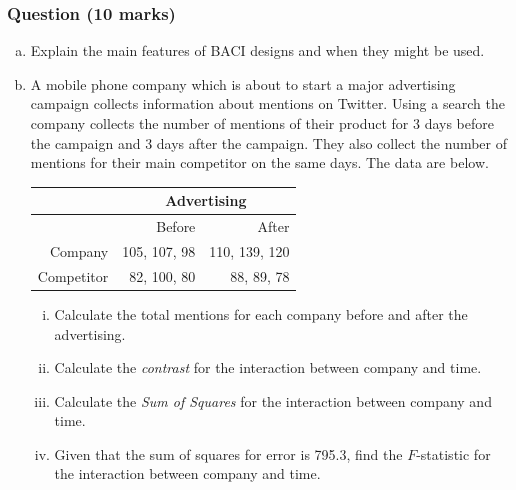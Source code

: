 \documentclass[a4paper,oneside]{book}
\begin{document}
\subsubsection*{Question (10 marks)}

\begin{enumerate}[a)]
\item Explain the main features of BACI designs and when they might be
  used.
\item A mobile phone company which is about to start a major
  advertising campaign collects information about mentions
  on Twitter. Using a search the company collects the number of
  mentions of their product for 3 days before the campaign and 3 days
  after the campaign. They also collect the number of mentions for
  their main competitor on the same days. The data are below.

\begin{center}
\begin{tabular}{|r|r|r|}\hline
&\multicolumn{2}{c|}{Advertising}\\ \hline
&Before&After\\ \hline\hline
Company&105, 107,  98& 110, 139, 120\\ \hline
Competitor&82, 100,  80&  88,  89,  78\\ \hline
\end{tabular}
\end{center}

\begin{enumerate}[i)]
\item Calculate the total mentions for each company before and after
  the advertising.
\item Calculate the \emph{contrast} for the interaction between
  company and time.
\item Calculate the \emph{Sum of Squares} for the interaction between
  company and time.
\item Given that the sum of squares for error is 795.3, find the
  $F$-statistic for the interaction between
  company and time.
\end{enumerate}
\end{enumerate}
\end{document}
